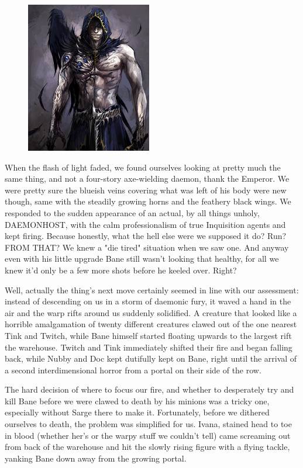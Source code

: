 \begin{figure}
	\begin{center}
		\includegraphics[width=\figwidth]{pics/19/56.png}
	\end{center}
\end{figure}
When the flash of light faded, we found ourselves looking at pretty much the same thing, and not a four-story axe-wielding daemon, thank the Emperor. 
We were pretty sure the blueish veins covering what was left of his body were new though, same with the steadily growing horns and the feathery black wings. 
We responded to the sudden appearance of an actual, by all things unholy, DAEMONHOST, with the calm professionalism of true Inquisition agents and kept firing. 
Because honestly, what the hell else were we supposed it do? 
Run? 
FROM THAT? 
We knew a "die tired" situation when we saw one. 
And anyway even with his little upgrade Bane still wasn't looking that healthy, for all we knew it'd only be a few more shots before he keeled over. 
Right?

Well, actually the thing's next move certainly seemed in line with our assessment: 
instead of descending on us in a storm of daemonic fury, it waved a hand in the air and the warp rifts around us suddenly solidified. 
A creature that looked like a horrible amalgamation of twenty different creatures clawed out of the one nearest Tink and Twitch, while Bane himself started floating upwards to the largest rift the warehouse. 
Twitch and Tink immediately shifted their fire and began falling back, while Nubby and Doc kept dutifully kept on Bane, right until the arrival of a second interdimensional horror from a portal on their side of the row.

The hard decision of where to focus our fire, and whether to desperately try and kill Bane before we were clawed to death by his minions was a tricky one, especially without Sarge there to make it. 
Fortunately, before we dithered ourselves to death, the problem was simplified for us. 
Ivana, stained head to toe in blood (whether her's or the warpy stuff we couldn't tell) came screaming out from back of the warehouse and hit the slowly rising figure with a flying tackle, yanking Bane down away from the growing portal. 



